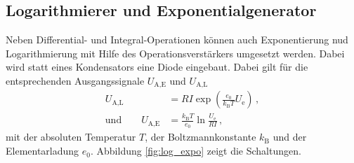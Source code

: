 \subsection{Logarithmierer und Exponentialgenerator}
\label{subsec:log_expo}
Neben Differential- und Integral-Operationen können auch Exponentierung nud
Logarithmierung mit Hilfe des Operationsverstärkers umgesetzt werden.
Dabei wird statt eines Kondensators eine Diode eingebaut.
Dabei gilt für die entsprechenden Ausgangssignale $U_\text{A,E}$ und 
$U_\text{A,L}$
\begin{align*}
    U_\text{A,L} &= R I \exp\left(\frac{e_0}{k_\text{B}T} U_\text{e}\right)\,,\\
    \text{und} \qquad U_\text{A,E} &= \frac{k_\text{B}T}{e_0}\ln \frac{U_\text{e}}{R I}\,,
\end{align*}
mit der absoluten Temperatur $T$, der Boltzmannkonstante $k_\text{B}$ und
der Elementarladung $e_0$. Abbildung \ref{fig:log_expo} zeigt die Schaltungen.
